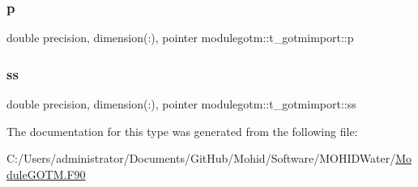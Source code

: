 \subsubsection{\texorpdfstring{p}{p}}
{\footnotesize\ttfamily double precision, dimension(\+:), pointer modulegotm\+::t\+\_\+gotmimport\+::p\hspace{0.3cm}{\ttfamily [private]}}

\mbox{\label{structmodulegotm_1_1t__gotmimport_a2111c50b582ead8cc49705b5d26ac827}} 
\subsubsection{\texorpdfstring{ss}{ss}}
{\footnotesize\ttfamily double precision, dimension(\+:), pointer modulegotm\+::t\+\_\+gotmimport\+::ss\hspace{0.3cm}{\ttfamily [private]}}



The documentation for this type was generated from the following file\+:\begin{DoxyCompactItemize}
\item 
C\+:/\+Users/administrator/\+Documents/\+Git\+Hub/\+Mohid/\+Software/\+M\+O\+H\+I\+D\+Water/\mbox{\hyperlink{_module_g_o_t_m_8_f90}{Module\+G\+O\+T\+M.\+F90}}\end{DoxyCompactItemize}
